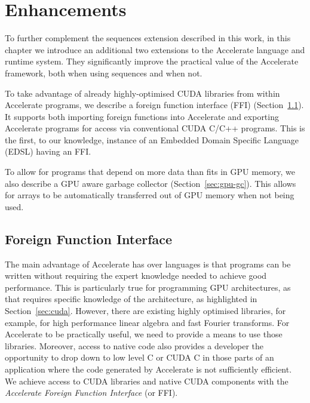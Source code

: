 \chapter{Enhancements}
\label{chap:enhancements}

To further complement the sequences extension described in this work, in this chapter we introduce an additional two extensions to the Accelerate language and runtime system. They significantly improve the practical value of the Accelerate framework, both when using sequences and when not.

To take advantage of already highly-optimised CUDA libraries from within Accelerate programs, we describe a foreign function interface (FFI) (Section~\ref{sec:foreign}). It supports both importing foreign functions into Accelerate and exporting Accelerate programs for access via conventional CUDA C/C++ programs. This is the first, to our knowledge, instance of an Embedded Domain Specific Language (EDSL) having an FFI.

To allow for programs that depend on more data than fits in GPU memory, we also describe a GPU aware garbage collector (Section~\ref{sec:gpu-gc}). This allows for arrays to be automatically transferred out of GPU memory when not being used.


\section{Foreign Function Interface}
\label{sec:foreign}


The main advantage of Accelerate has over languages is that programs can be written without requiring the expert knowledge needed to achieve good performance. This is particularly true for programming GPU architectures, as that requires specific knowledge of the architecture, as highlighted in Section~\ref{sec:cuda}. However, there are existing highly optimised libraries, for example, for high performance linear algebra and fast Fourier transforms. For Accelerate to be practically useful, we need to provide a means to use those libraries. Moreover, access to native code also provides a developer the opportunity to drop down to low level C or CUDA C in those parts of an application where the code generated by Accelerate is not sufficiently efficient. We achieve access to CUDA libraries and native CUDA components with the \emph{Accelerate Foreign Function Interface} (or FFI).

